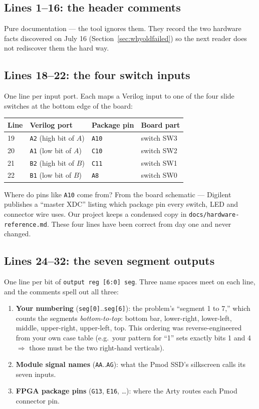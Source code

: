 \documentclass[11pt]{article}
\begin{document}
\subsection{Lines 1--16: the header comments}
Pure documentation --- the tool ignores them. They record the two hardware
facts discovered on July 16 (Section~\ref{sec:whyoldfailed}) so the next
reader does not rediscover them the hard way.

\subsection{Lines 18--22: the four switch inputs}
One line per input port. Each maps a Verilog input to one of the four
slide switches at the bottom edge of the board:

\begin{center}
\begin{tabular}{@{}llll@{}}
\toprule
Line & Verilog port & Package pin & Board part \\
\midrule
19 & \texttt{A2} (high bit of $A$) & \texttt{A10} & switch SW3 \\
20 & \texttt{A1} (low bit of $A$)  & \texttt{C10} & switch SW2 \\
21 & \texttt{B2} (high bit of $B$) & \texttt{C11} & switch SW1 \\
22 & \texttt{B1} (low bit of $B$)  & \texttt{A8}  & switch SW0 \\
\bottomrule
\end{tabular}
\end{center}

Where do pins like \texttt{A10} come from? From the board schematic ---
Digilent publishes a ``master XDC'' listing which package pin every
switch, LED and connector wire uses. Our project keeps a condensed copy in
\texttt{docs/hardware-reference.md}. These four lines have been correct
from day one and never changed.

\subsection{Lines 24--32: the seven segment outputs}
One line per bit of \texttt{output reg [6:0] seg}. Three name spaces
meet on each line, and the comments spell out all three:

\begin{enumerate}
  \item \textbf{Your numbering} (\texttt{seg[0]}..\texttt{seg[6]}): the
    problem's ``segment 1 to 7,'' which counts the segments
    \emph{bottom-to-top}: bottom bar, lower-right, lower-left, middle,
    upper-right, upper-left, top. This ordering was reverse-engineered
    from your own case table (e.g.\ your pattern for ``1'' sets exactly
    bits 1 and 4 $\Rightarrow$ those must be the two right-hand verticals).
  \item \textbf{Module signal names} (\texttt{AA}..\texttt{AG}): what the
    Pmod SSD's silkscreen calls its seven inputs.
  \item \textbf{FPGA package pins} (\texttt{G13}, \texttt{E16}, \dots):
    where the Arty routes each Pmod connector pin.
\end{enumerate}
\end{document}
